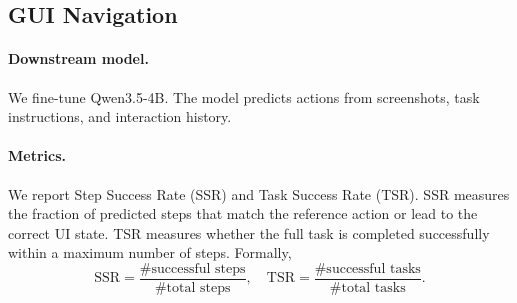 \documentclass{llmxive}
\begin{document}


\subsection{GUI Navigation}
\label{app:gui_downstream}

\paragraph{Downstream model.}
We fine-tune Qwen3.5-4B. The model predicts actions from screenshots, task instructions, and interaction history.

\paragraph{Metrics.}
We report Step Success Rate (SSR) and Task Success Rate (TSR). SSR measures the fraction of predicted steps that match the reference action or lead to the correct UI state. TSR measures whether the full task is completed successfully within a maximum number of steps. Formally,
\begin{equation}
\mathrm{SSR}
=
\frac{\#\text{successful steps}}{\#\text{total steps}},
\quad
\mathrm{TSR}
=
\frac{\#\text{successful tasks}}{\#\text{total tasks}}.
\end{equation}
\end{document}
